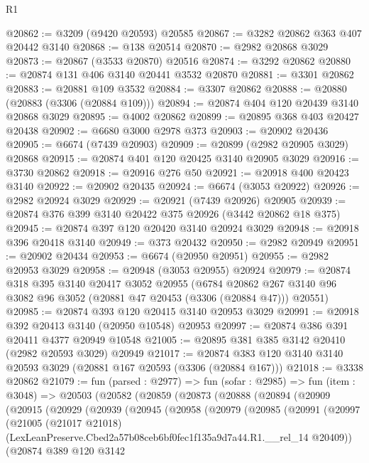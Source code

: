 \begin{lexlean}{R1}
\begin{coremodule}
@20862 := @3209 (@9420 @20593) @20585
@20867 := @3282 @20862 @363 @407 @20442 @3140
@20868 := @138 @20514
@20870 := @2982 @20868 @3029
@20873 := @20867 (@3533 @20870) @20516
@20874 := @3292 @20862
@20880 := @20874 @131 @406 @3140 @20441 @3532 @20870
@20881 := @3301 @20862
@20883 := @20881 @109 @3532
@20884 := @3307 @20862
@20888 := @20880 (@20883 (@3306 (@20884 @109)))
@20894 := @20874 @404 @120 @20439 @3140 @20868 @3029
@20895 := @4002 @20862
@20899 := @20895 @368 @403 @20427 @20438
@20902 := @6680 @3000 @2978 @373
@20903 := @20902 @20436
@20905 := @6674 (@7439 @20903)
@20909 := @20899 (@2982 @20905 @3029) @20868
@20915 := @20874 @401 @120 @20425 @3140 @20905 @3029
@20916 := @3730 @20862
@20918 := @20916 @276 @50
@20921 := @20918 @400 @20423 @3140
@20922 := @20902 @20435
@20924 := @6674 (@3053 @20922)
@20926 := @2982 @20924 @3029
@20929 := @20921 (@7439 @20926) @20905
@20939 := @20874 @376 @399 @3140 @20422 @375 @20926 (@3442 @20862 @18 @375)
@20945 := @20874 @397 @120 @20420 @3140 @20924 @3029
@20948 := @20918 @396 @20418 @3140
@20949 := @373 @20432
@20950 := @2982 @20949
@20951 := @20902 @20434
@20953 := @6674 (@20950 @20951)
@20955 := @2982 @20953 @3029
@20958 := @20948 (@3053 @20955) @20924
@20979 := @20874
    @318
    @395
    @3140
    @20417
    @3052
    @20955
    (@6784 @20862 @267 @3140 @96 @3082 @96 @3052 (@20881 @47 @20453 (@3306 (@20884 @47))) @20551)
@20985 := @20874 @393 @120 @20415 @3140 @20953 @3029
@20991 := @20918 @392 @20413 @3140 (@20950 @10548) @20953
@20997 := @20874 @386 @391 @20411 @4377 @20949 @10548
@21005 := @20895 @381 @385 @3142 @20410 (@2982 @20593 @3029) @20949
@21017 := @20874 @383 @120 @3140 @3140 @20593 @3029 (@20881 @167 @20593 (@3306 (@20884 @167)))
@21018 := @3338 @20862
@21079 := fun (parsed : @2977) =>
  fun (sofar : @2985) =>
  fun (item : @3048) =>
  @20503
    (@20582
      (@20859
        (@20873
          (@20888
            (@20894
              (@20909
                (@20915
                  (@20929
                    (@20939
                      (@20945
                        (@20958
                          (@20979
                            (@20985
                              (@20991
                                (@20997
                                  (@21005
                                    (@21017 @21018)
                                    (LexLeanPreserve.Cbed2a57b08ceb6bf0fec1f135a9d7a44.R1.__rel_14
                                      @20409))
                                  (@20874
                                    @389
                                    @120
                                    @3142

\end{coremodule}
\end{lexlean}

